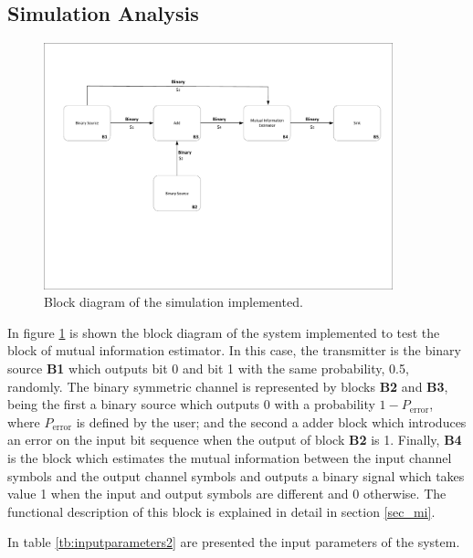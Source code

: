 \begin{refsection}
\begin{figure}[H]
\end{figure}

\subsection{Simulation Analysis}
\label{subsec:simulationmi}

\begin{figure}[H]
    \centering
        \includegraphics[clip, trim=1.0cm 6cm 1.0cm 2cm, width=0.90\textwidth]{./sdf/eit_87071_mutual_information_estimator/figures/block_diagram.pdf}
    \caption{Block diagram of the simulation implemented.}\label{fig:block_diagram}
\end{figure}

In figure \ref{fig:block_diagram} is shown the block diagram of the system implemented to test the block of mutual information estimator. In this case, the transmitter is the binary source \textbf{B1} which outputs bit 0 and bit 1 with the same probability, 0.5, randomly. The binary symmetric channel is represented by blocks \textbf{B2} and \textbf{B3}, being the first a binary source which outputs 0 with a probability $1-P_{\textrm{error}}$, where $P_{\textrm{error}}$ is defined by the user; and the second a adder block which introduces an error on the input bit sequence when the output of block \textbf{B2} is 1. Finally, \textbf{B4} is the block which estimates the mutual information between the input channel symbols and the output channel symbols and outputs a binary signal which takes value 1 when the input and output symbols are different and 0 otherwise. The functional description of this block is explained in detail in section \ref{sec_mi}.

In table \ref{tb:inputparameters2} are presented the input parameters of the system.


\end{refsection}
